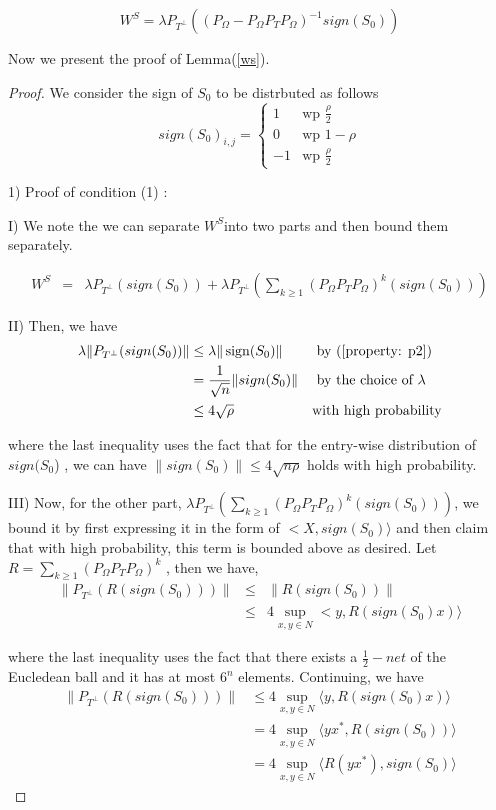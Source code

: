 \[
W^{S}=\lambda P_{T^{\bot}}((P_{\Omega}-P_{\Omega}P_{T}P_{\Omega})^{-1}sign(S_{0}))
\]

Now we present the proof of Lemma(\ref{ws}). 
\begin{proof}
We consider the sign of $S_{0}$ to be distrbuted as follows
\[
sign(S_{0})_{i,j}=\begin{cases}
1 & \text{wp }\frac{\rho}{2}\\
0 & \text{wp }1-\rho\\
-1 & \text{wp }\frac{\rho}{2}
\end{cases}
\]


1) Proof of condition (1) :

I) We note the we can separate $W^{S}$into two parts and then bound them separately.

\begin{eqnarray*}
W^{S} & = & \lambda P_{T^{\bot}}(sign(S_{0}))+\lambda P_{T^{\bot}}(\sum_{k\ge1}(P_{\Omega}P_{T}P_{\Omega})^{k}(sign(S_{0})))
\end{eqnarray*}


II) Then, we have
\begin{align*}
\lambda \| P_{T^{\bot}}(sign(S_{0})) \| 
& \le \lambda\| \operatorname{sign}(S_{0}) \|  &&\text{ by (\ref{property: p2})}\\
& = \frac{1}{\sqrt{n}}\|sign(S_{0})\| &&\text{ by the choice of }  \lambda\\
& \le 4\sqrt{\rho} &&\text{with high probability}
\end{align*}


where the last inequality uses the fact that for the entry-wise distribution of $sign(S_{0}$) , we can have $\|sign(S_{0})\|\le4\sqrt{n\rho}$ holds with high probability.

III) Now, for the other part, $\lambda P_{T^{\bot}}(\sum_{k\ge1}(P_{\Omega}P_{T}P_{\Omega})^{k}(sign(S_{0})))$, we bound it by first expressing it in the form of $<X,sign(S_{0})\rangle$ and then claim that with high probability, this term is bounded above as desired. Let $R=\sum_{k\ge1}(P_{\Omega}P_{T}P_{\Omega})^{k}$ ,
then we have,
\begin{eqnarray*}
\|P_{T^{\bot}}(R(sign(S_{0})))\| & \le & \|R(sign(S_{0}))\|\\
 & \le & 4\sup_{x,y\in N}<y,R(sign(S_{0})x)\rangle
\end{eqnarray*}


where the last inequality uses the fact that there exists a $\frac{1}{2}-net$ of the Eucledean ball and it has at most $6^{n}$ elements. Continuing, we have
\begin{align} 
\|P_{T^{\bot}}(R(sign(S_{0})))\| 
& \le 4\sup_{x,y \in N} \langle y,R(sign(S_{0})x) \rangle \nonumber \\
& = 4\sup_{x,y \in N} \langle yx^{*},R(sign(S_{0})) \rangle \nonumber \\
& = 4\sup_{x,y \in N} \langle R(yx^{*}),sign(S_{0}) \rangle 
\label{net}
\end{align}



\end{proof}
